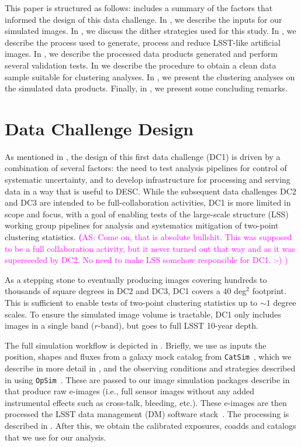 \documentclass[twocolumn]{aastex62}
\newcommand{\as}[1]{{\textcolor{magenta}{{\textbf (AS: #1)}}}}
\begin{document}
This paper is structured as follows:  includes a summary of the factors that informed
the design of this data challenge.  In , we describe the inputs for our simulated images. In , we discuss the dither strategies used for this study. In , we describe the process used to generate, process and reduce LSST-like artificial images. In , we describe the processed data products generated and perform several validation tests. In  we describe the procedure to obtain a clean data sample suitable for clustering analyses. In , we present the clustering analyses on the simulated data products. Finally, in , we present some concluding remarks.

\section{Data Challenge Design}
\label{sec:design}

As mentioned in , the design of this first data challenge (DC1) is driven by a
combination of several factors: the need to test analysis pipelines for control of systematic
uncertainty, and to develop infrastructure for processing and serving data in a way that is useful
to DESC.  While the subsequent data challenges DC2 and DC3 are intended to be full-collaboration activities, DC1 is more limited in
scope and focus, with a goal of enabling tests of the large-scale structure (LSS) working group
pipelines for analysis and systematics mitigation of two-point clustering statistics.
\as{Come on, that is absolute bullshit. This was supposed to be a full
  collaboration activity, but it never turned out that way and as it
  was superseeded by DC2. No need to make LSS somehow responsible for
  DC1. :-) }

As a stepping stone to eventually producing images covering hundreds to thousands of square degrees
in DC2 and DC3, DC1 covers a $40$ deg$^2$ footprint.  This is sufficient to enable tests of
two-point clustering statistics up to $\sim 1$ degree scales.  To ensure the simulated image volume is
tractable, DC1 only includes images in a single band ($r$-band), but goes to full LSST 10-year
depth. 

The full simulation workflow is depicted in . Briefly, we use as inputs the position, shapes and fluxes from a galaxy mock catalog from \texttt{CatSim}~\citep{2010SPIE.7738E..1OC,2014SPIE.9150E..14C}, which we describe in more detail in , and the observing conditions and strategies described in  using \texttt{OpSim}~\citep{2014SPIE.9150E..15D}. These are passed to our image simulation packages describe in  that produce raw e-images (i.e., full sensor images without any added instrumental effects such as cross-talk, bleeding, etc.). These e-images are then processed the LSST data management (DM) software stack~\citep{2015arXiv151207914J}. The processing is described in . After this, we obtain the calibrated exposures, coadds and catalogs that we use for our analysis.
\end{document}
